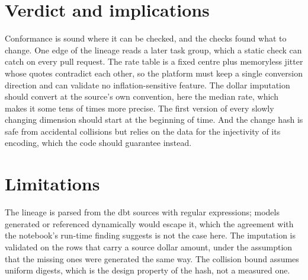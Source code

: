 \section{Verdict and implications}\label{sec:cf-verdict}

Conformance is sound where it can be checked, and the checks found what to change. One edge of the lineage reads a later
task group, which a static check can catch on every pull request. The rate table is a fixed centre plus memoryless
jitter whose quotes contradict each other, so the platform must keep a single conversion direction and can validate no
inflation-sensitive feature. The dollar imputation should convert at the source's own convention, here the median rate,
which makes it some tens of times more precise. The first version of every slowly changing dimension should start at the
beginning of time. And the change hash is safe from accidental collisions but relies on the data for the injectivity of
its encoding, which the code should guarantee instead.

\section{Limitations}\label{sec:cf-limits}

The lineage is parsed from the dbt sources with regular expressions; models generated or referenced dynamically would
escape it, which the agreement with the notebook's run-time finding suggests is not the case here. The imputation is
validated on the rows that carry a source dollar amount, under the assumption that the missing ones were generated the same
way. The collision bound assumes uniform digests, which is the design property of the hash, not a measured one.
